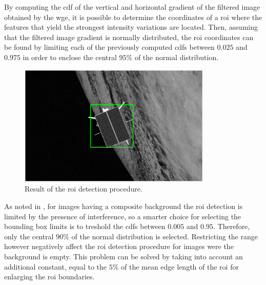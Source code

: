By computing the \acrfull{cdf} of the vertical and horizontal gradient of the filtered image obtained by the \acrshort{wge}, it is possible to determine the coordinates of a \acrshort{roi} where the features that yield the strongest intensity variations are located. Then, assuming that the filtered image gradient is normally distributed, the \acrshort{roi} coordinates can be found by limiting each of the previously computed \acrshort{cdf}s between $0.025$ and $0.975$ in order to enclose the central $95\%$ of the normal distribution.

\begin{figure}[htbp]
  \centering
  \includegraphics[width=0.82\textwidth]{gfx/FeatureDetection/ROI.eps}
  \caption{Result of the \acrshort{roi} detection procedure.}
  \label{fig:ROI}
\end{figure}

As noted in \cite{fracchio2019}, for images having a composite background the \acrshort{roi} detection is limited by the presence of interference, so a smarter choice for selecting the bounding box limits is to treshold the \acrshort{cdf}s between $0.005$ and $0.95$. Therefore, only the central $90\%$ of the normal distribution is selected. Restricting the range however negatively affect the \acrshort{roi} detection procedure for images were the background is empty. This problem can be solved by taking into account an additional constant, equal to the $5\%$ of the mean edge length of the \acrshort{roi} for enlarging the \acrshort{roi} boundaries.

